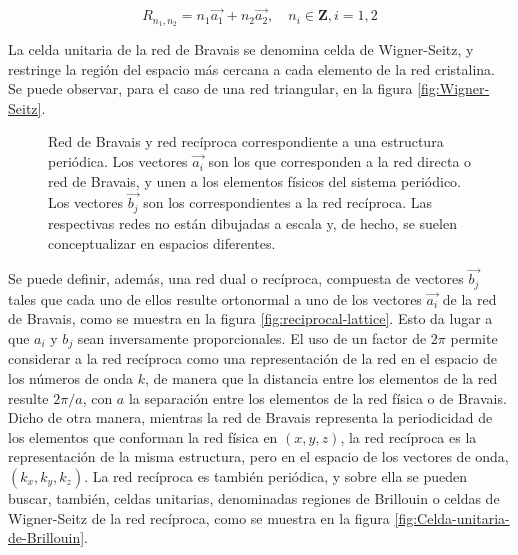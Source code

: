 \begin{equation}
R_{n_1,n_2} = n_1 \vec{a_1} + n_2 \vec{a_2}, \quad n_i \in \textbf{Z}, i={1,2}
\end{equation}

La celda unitaria de la red de Bravais se denomina celda de Wigner-Seitz, y restringe la región del espacio más cercana a cada elemento de la red cristalina. Se puede observar, para el caso de una red triangular, en la figura \ref{fig:Wigner-Seitz}.

\begin{figure}[H]
	\centering 
	\hspace{0pt}
	\caption{Red de Bravais y red recíproca correspondiente a una estructura periódica. Los vectores $\vec{a_i}$ son los que corresponden a la red directa o red de Bravais, y unen a los elementos físicos del sistema periódico. Los vectores $\vec{b_j}$ son los correspondientes a la red recíproca. Las respectivas redes no están dibujadas a escala y, de hecho, se suelen conceptualizar en espacios diferentes.}
	\label{fig:direct-and-reciprocal-lattice}
\end{figure}

Se puede definir, además, una red dual o recíproca, compuesta de vectores $\vec{b_j}$ tales que cada uno de ellos resulte ortonormal a uno de los vectores $\vec{a_i}$ de la red de Bravais, como se muestra en la figura \ref{fig:reciprocal-lattice}. Esto da lugar a que $a_i$ y $b_j$ sean inversamente proporcionales. El uso de un factor de $2\pi$ permite considerar a la red recíproca como una representación de la red en el espacio de los números de onda $k$, de manera que la distancia entre los elementos de la red resulte $2\pi/a$, con $a$ la separación entre los elementos de la red física o de Bravais. Dicho de otra manera, mientras la red de Bravais representa la periodicidad de los elementos que conforman la red física en $(x,y,z)$, la red recíproca es la representación de la misma estructura, pero en el espacio de los vectores de onda, $(k_x, k_y, k_z)$. La red recíproca es también periódica, y sobre ella se pueden buscar, también, celdas unitarias, denominadas regiones de Brillouin o celdas de Wigner-Seitz de la red recíproca, como se muestra en la figura \ref{fig:Celda-unitaria-de-Brillouin}.

